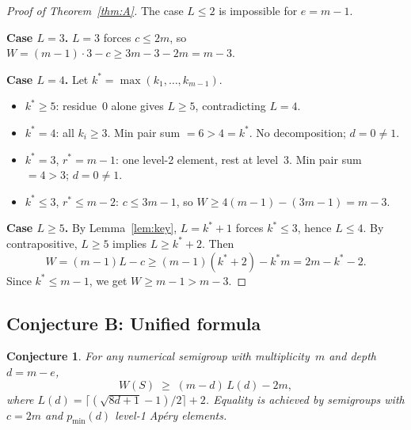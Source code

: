 \documentclass[11pt,a4paper]{amsart}
\newtheorem{conjecture}[theorem]{Conjecture}
\theoremstyle{definition}
\theoremstyle{remark}
\begin{document}
\begin{proof}[Proof of Theorem~\ref{thm:A}]
The case $L \le 2$ is impossible for $e = m{-}1$.

\medskip\noindent\textbf{Case $L = 3$.}
$L = 3$ forces $c \le 2m$, so $W = (m{-}1)\cdot 3 - c \ge 3m{-}3{-}2m = m{-}3$.

\medskip\noindent\textbf{Case $L = 4$.}
Let $k^* = \max(k_1,\dots,k_{m-1})$.
\begin{itemize}[nosep]
\item $k^* \ge 5$: residue~$0$ alone gives $L \ge 5$, contradicting $L = 4$.
\item $k^* = 4$: all $k_i \ge 3$.  Min pair sum $= 6 > 4 = k^*$.
  No decomposition; $d = 0 \ne 1$.
\item $k^* = 3$, $r^* = m{-}1$: one level-2 element, rest at level~3.
  Min pair sum $= 4 > 3$; $d = 0 \ne 1$.
\item $k^* \le 3$, $r^* \le m{-}2$: $c \le 3m{-}1$,
  so $W \ge 4(m{-}1) - (3m{-}1) = m{-}3$.
\end{itemize}

\medskip\noindent\textbf{Case $L \ge 5$.}
By Lemma~\ref{lem:key}, $L = k^*{+}1$ forces $k^* \le 3$, hence $L \le 4$.
By contrapositive, $L \ge 5$ implies $L \ge k^*{+}2$.  Then
\[
  W = (m{-}1)L - c \ge (m{-}1)(k^*{+}2) - k^*m = 2m - k^* - 2.
\]
Since $k^* \le m{-}1$, we get $W \ge m{-}1 > m{-}3$.
\end{proof}

\subsection{Conjecture B: Unified formula}

\begin{conjecture}\label{conj:B}
For any numerical semigroup with multiplicity~$m$ and depth $d = m - e$,
\[
  W(S) \;\ge\; (m-d)\,L(d) - 2m,
\]
where $L(d) = \lceil(\sqrt{8d+1}-1)/2\rceil + 2$.
Equality is achieved by semigroups with $c = 2m$ and $p_{\min}(d)$
level-1 Ap\'ery elements.
\end{conjecture}
\end{document}
